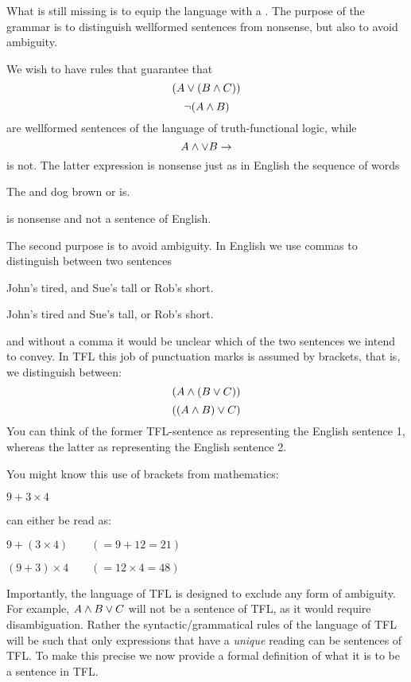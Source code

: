 What is still missing is to equip the language with a . The purpose of the grammar is to distinguish wellformed sentences from nonsense, but also to avoid ambiguity.

We wish to have rules that guarantee that
$$(A\vee (B\mathbin{\wedge} C))$$ $$\neg (A\mathbin{\wedge} B)$$
are wellformed sentences of the language of truth-functional logic, while
$$A\mathbin{\wedge}\vee B\rightarrow$$
is not. The latter expression is nonsense just as in English the sequence of words
\begin{center}
The and dog brown or is.
\end{center}
is nonsense and not a sentence of English.



The second purpose is to avoid ambiguity. In English we use commas to distinguish between two sentences
\begin{earg}
\item[\ex{engamb1}] John's tired, and Sue's tall or Rob's short.
\item[\ex{engamb2}] John's tired and Sue's tall, or Rob's short.
\end{earg}
and without a comma it would be unclear which of the two sentences we intend to convey. In TFL this job of punctuation marks is assumed by brackets, that is, we distinguish between:
$$(A\mathbin{\wedge}(B\vee C))$$
$$((A\mathbin{\wedge} B)\vee C)$$
You can think of the former TFL-sentence as representing the English sentence 1, whereas the latter as representing the English sentence 2.

You might know this use of brackets from mathematics:
\begin{earg}
\item[\ex{mathamb}] $9 + 3 \times 4$
\end{earg}
can either be read as:
\begin{earg}
\item[\ex{mathamb1}] $9 + (3 \times 4) \qquad(=9+12=21)$
\item[\ex{mathamb2}] $(9+3) \times 4 \qquad(=12\times 4=48)$
\end{earg}

Importantly, the language of TFL is designed to exclude any form of ambiguity. For example, $A\mathbin{\wedge} B\vee C$ will not be a sentence of TFL, as it would require disambiguation. Rather the syntactic/grammatical rules of the language of TFL will be such that only expressions that have a \emph{unique} reading can be sentences of TFL. To make this precise we now provide a formal definition of what it is to be a sentence in TFL.

